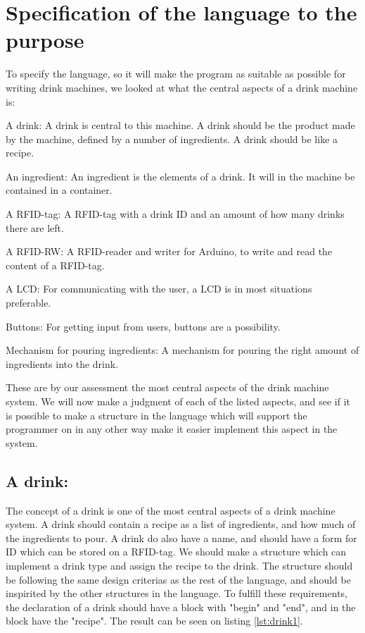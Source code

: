 

\section{Specification of the language to the purpose}
To specify the language, so it will make the program as suitable as possible for writing drink machines, we looked at what the central aspects of a drink machine is:
\begin{inddes}
\item[A drink:] A drink is central to this machine. A drink should be the product made by the machine, defined by a number of ingredients. A drink should be like a recipe.
\item[An ingredient:] An ingredient is the elements of a drink. It will in the machine be contained in a container. 
\item[A RFID-tag:] A RFID-tag with a drink ID and an amount of how many drinks there are left.
\item[A RFID-RW:] A RFID-reader and writer for Arduino, to write and read the content of a RFID-tag.
\item[A LCD:] For communicating with the user, a LCD is in most situations preferable.
\item[Buttons:] For getting input from users, buttons are a possibility. 
\item[Mechanism for pouring ingredients:] A mechanism for pouring the right amount of ingredients into the drink.
\end{inddes}
These are by our assessment the most central aspects of the drink machine system. We will now make a judgment of each of the listed aspects, and see if it is possible to make a structure in the language which will support the programmer on in any other way make it easier implement this aspect in the system.
\subsection{A drink:}
The concept of a drink is one of the most central aspects of a drink machine system. A drink should contain a recipe as a list of ingredients, and how much of the ingredients to pour. A drink do also have a name, and should have a form for ID which can be stored on a RFID-tag. We should make a structure which can implement a drink type and assign the recipe to the drink. The structure should be following the same design criterias as the rest of the language, and should be inspirited by the other structures in the language. To fulfill these requirements, the declaration of a drink should have a block with "begin" and "end", and in the block have the "recipe". The result can be seen on listing \ref{lst:drink1}.

